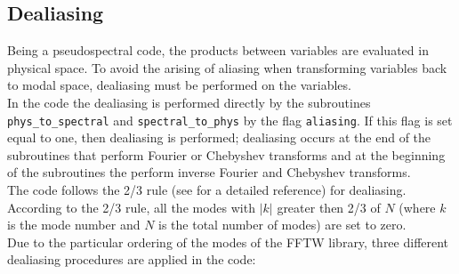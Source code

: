 \subsection{Dealiasing}
Being a pseudospectral code, the products between variables are evaluated in physical space. To avoid the arising of aliasing when transforming variables back to modal space, dealiasing must be performed on the variables.\\
In the code the dealiasing is performed directly by the subroutines \texttt{phys\_to\_spectral} and \texttt{spectral\_to\_phys} by the flag \texttt{aliasing}. If this flag is set equal to one, then dealiasing is performed; dealiasing occurs at the end of the subroutines that perform Fourier or Chebyshev transforms and at the beginning of the subroutines the perform inverse Fourier and Chebyshev transforms.\\
The code follows the 2/3 rule (see \cite{CanutoHQZ06} for a detailed reference) for dealiasing. According to the 2/3 rule, all the modes with $|k|$ greater then 2/3 of $N$ (where $k$ is the mode number and $N$ is the total number of modes) are set to zero.\\
Due to the particular ordering of the modes of the FFTW library, three different dealiasing procedures are applied in the code:
